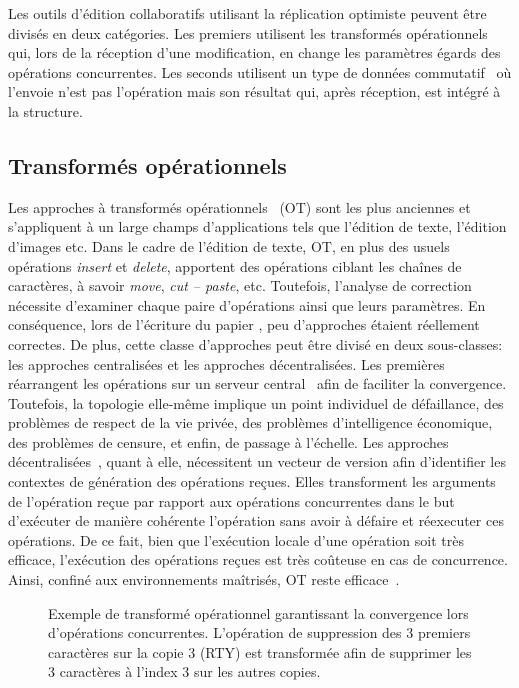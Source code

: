 Les outils d'édition collaboratifs utilisant la réplication optimiste peuvent
être divisés en deux catégories. Les premiers utilisent les transformés
opérationnels~\cite{sun2009contextbased, sun1998operational} qui, lors de la
réception d'une modification, en change les paramètres égards des opérations
concurrentes. Les seconds utilisent un type de données
commutatif~\cite{shapiro2011comprehensive, shapiro2011conflict} où l'envoie
n'est pas l'opération mais son résultat qui, après réception, est intégré à la
structure. 

\subsection{Transformés opérationnels}

Les approches à transformés opérationnels~\cite{sun2009contextbased,
  sun1998operational} (OT) sont les plus anciennes et s'appliquent à un large
champs d'applications tels que l'édition de texte, l'édition d'images etc. Dans
le cadre de l'édition de texte, OT, en plus des usuels opérations \emph{insert}
et \emph{delete}, apportent des opérations ciblant les chaînes de caractères, à
savoir \emph{move}, \emph{cut -- paste}, etc. Toutefois, l'analyse de correction
nécessite d'examiner chaque paire d'opérations ainsi que leurs paramètres. En
conséquence, lors de l'écriture du papier \cite{imine2003proving}, peu
d'approches étaient réellement correctes. De plus, cette classe d'approches peut
être divisé en deux sous-classes: les approches centralisées et les approches
décentralisées. Les premières réarrangent les opérations sur un serveur
central~\cite{nichols1995high} afin de faciliter la convergence. Toutefois, la
topologie elle-même implique un point individuel de défaillance, des problèmes
de respect de la vie privée, des problèmes d'intelligence économique, des
problèmes de censure, et enfin, de passage à l'échelle. Les approches
décentralisées~\cite{sun2009contextbased}, quant à elle, nécessitent un vecteur
de version afin d'identifier les contextes de génération des opérations
reçues. Elles transforment les arguments de l'opération reçue par rapport aux
opérations concurrentes dans le but d'exécuter de manière cohérente l'opération
sans avoir à défaire et réexecuter ces opérations. De ce fait, bien que
l'exécution locale d'une opération soit très efficace, l'exécution des
opérations reçues est très coûteuse en cas de concurrence. Ainsi, confiné aux
environnements maîtrisés, OT reste efficace~\cite{mehdi2014merging}.

\begin{figure}
  \centering
  
  \caption{\label{fig:lseq:otexample}Exemple de transformé opérationnel
    garantissant la convergence lors d'opérations concurrentes. L'opération de
    suppression des 3 premiers caractères sur la copie 3 (RTY) est transformée
    afin de supprimer les 3 caractères à l'index 3 sur les autres copies.}
\end{figure}

